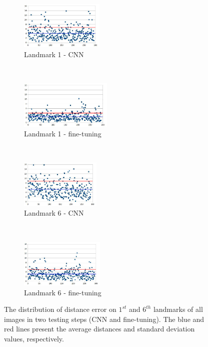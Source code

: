\documentclass{article} %
\begin{document}
\begin{multicols}{2}
\begin{figure}[H]
   
    \begin{subfigure}[t]{0.24\textwidth}
        \centering
        \includegraphics[height=0.9in]{images/lm1_cnn_2}
        \caption{\footnotesize{Landmark 1 - CNN}}
        \label{figsub11}
    \end{subfigure}%
    ~ 
    \begin{subfigure}[t]{0.24\textwidth}
        \centering
        \includegraphics[height=0.9in]{images/lm1_finetuning_2}
        \caption{\footnotesize{Landmark 1 - fine-tuning}}
        \label{figsub22}
    \end{subfigure}~\\
    \begin{subfigure}[t]{0.24\textwidth}
        \centering
        \includegraphics[height=0.9in]{images/lm6_cnn_2}
        \caption{\footnotesize{Landmark 6 - CNN}}
        \label{figsub111}
    \end{subfigure}%
    ~ 
    \begin{subfigure}[t]{0.24\textwidth}
        \centering
        \includegraphics[height=0.9in]{images/lm6_finetuning_2}
        \caption{\footnotesize{Landmark 6 - fine-tuning}}
        \label{figsub222}
    \end{subfigure}
    \caption{\footnotesize{The distribution of distance error on $1^{st}$ and $6^{th}$ landmarks of all images in two testing steps (CNN and fine-tuning). The blue and red lines present the average distances and standard deviation values, respectively.}}
    \label{figrsexample2}
\end{figure}


\end{multicols}
\end{document}
